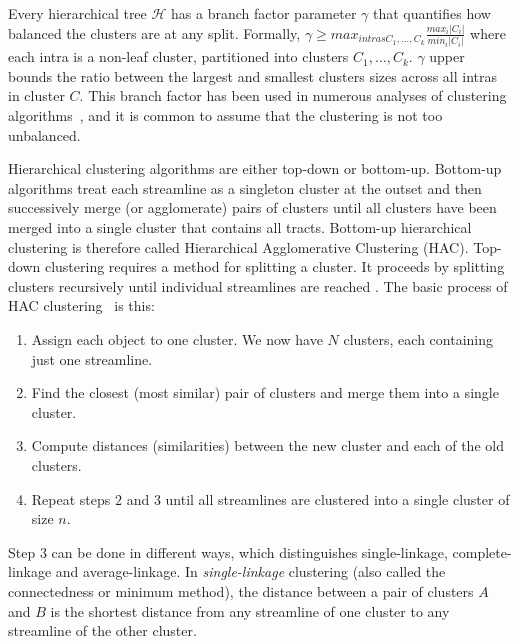 Every hierarchical tree $\mathcal{H}$ has a branch factor parameter $\gamma$ that quantifies how balanced the clusters are at any split.
Formally, $\gamma \geq max_{intras{C_1, \ldots,C_k}} \frac{max_i |C_i|}{min_i |C_i|}$
 where each intra is a non-leaf cluster, partitioned into clusters ${C_1, \ldots, C_k}$. $\gamma$ upper bounds the ratio between the largest and smallest clusters sizes across all intras in cluster $C$. This branch factor has been used in numerous analyses of clustering algorithms~\cite{eriksson2011active,balakrishnan2011noise}, and it is common to assume that the clustering is not too unbalanced.

Hierarchical clustering algorithms are either top-down or bottom-up. Bottom-up algorithms treat each streamline as a singleton cluster at the outset and then successively merge (or agglomerate) pairs of clusters until all clusters have been merged into a single cluster that contains all tracts. Bottom-up hierarchical clustering is therefore called Hierarchical Agglomerative Clustering (HAC). Top-down clustering requires a method for splitting a cluster. It proceeds by splitting clusters recursively until individual streamlines are reached \cite{johnson1967hierarchical}.
The basic process of HAC clustering~\cite{johnson1967hierarchical} is this:
\begin{enumerate}
	\item Assign each object to one cluster. We now have $N$ clusters, each containing just one streamline.
	\item Find the closest (most similar) pair of clusters and merge them into a single cluster.
	\item Compute distances (similarities) between the new cluster and each of the old clusters.
	\item Repeat steps $2$ and $3$ until all streamlines are clustered into a single cluster of size $n$.
\end{enumerate}
Step $3$ can be done in different ways, which distinguishes single-linkage, complete-linkage and average-linkage.
In \emph{single-linkage} clustering (also called the connectedness or minimum method), the distance between a pair of clusters $A$ and $B$ is the shortest distance from any streamline of one cluster to any streamline of the other cluster. 
